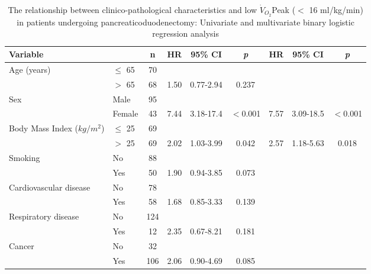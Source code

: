 \begin{sidewaystable}[p]
	\caption{The relationship between clinico-pathological characteristics and low $\dot{V}_{O_2}$Peak ($<$ 16 ml/kg/min) in patients undergoing pancreaticoduodenectomy: Univariate and multivariate binary logistic regression analysis}
	\label{table:cpet_oj_peak_regression}
	\setlength{\tabcolsep}{9pt} %
	\centering
	\begin{tabular}{|l l c| c c c| c c c|}
		\hline
		Variable                   &           & n   & HR   & 95\% CI   & \textit{p} & HR   & 95\% CI   & \textit{p} \\ \hline
		Age (years)                & $\leq$ 65 & 70  &      &           &            &      &           &  \\
		                           & $>$ 65    & 68  & 1.50 & 0.77-2.94 & 0.237      &      &           &  \\
		Sex                        & Male      & 95  &      &           &            &      &           &  \\
		                           & Female    & 43  & 7.44 & 3.18-17.4 & $<$0.001   & 7.57 & 3.09-18.5 & $<$0.001   \\
		Body Mass Index ($kg/m^2$) & $\leq$ 25 & 69  &      &           &            &      &           &  \\
		                           & $>$ 25    & 69  & 2.02 & 1.03-3.99 & 0.042      & 2.57 & 1.18-5.63 & 0.018      \\
		Smoking                    & No        & 88  &      &           &            &      &           &  \\
		                           & Yes       & 50  & 1.90 & 0.94-3.85 & 0.073      &      &           &  \\
		Cardiovascular disease     & No        & 78  &      &           &            &      &           &  \\
		                           & Yes       & 58  & 1.68 & 0.85-3.33 & 0.139      &      &           &  \\
		Respiratory disease        & No        & 124 &      &           &            &      &           &  \\
		                           & Yes       & 12  & 2.35 & 0.67-8.21 & 0.181      &      &           &  \\
		Cancer                     & No        & 32  &      &           &            &      &           &  \\
		                           & Yes       & 106 & 2.06 & 0.90-4.69 & 0.085      &      &           &  \\

\end{tabular}
\end{sidewaystable}
